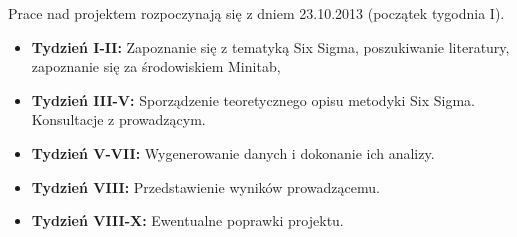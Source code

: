 Prace nad projektem rozpoczynają się z dniem 23.10.2013 (początek tygodnia I).

\begin{itemize}
	\item \textbf{Tydzień I-II:} Zapoznanie się z tematyką Six Sigma, poszukiwanie literatury,
	zapoznanie się za środowiskiem Minitab,
	\item \textbf{Tydzień III-V:} Sporządzenie teoretycznego opisu metodyki Six Sigma.
	Konsultacje z prowadzącym.
	\item \textbf{Tydzień V-VII:} Wygenerowanie danych i dokonanie ich analizy.
	\item \textbf{Tydzień VIII:} Przedstawienie wyników prowadzącemu.
	\item \textbf{Tydzień VIII-X:} Ewentualne poprawki projektu.
\end{itemize}